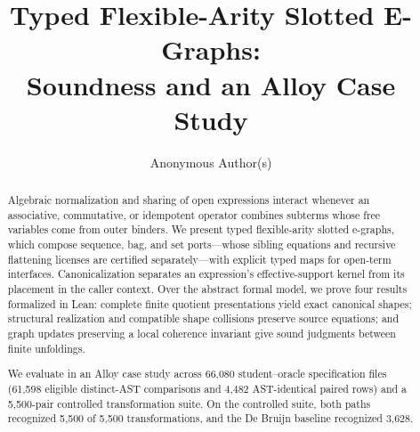\documentclass[runningheads]{llncs}
\title{Typed Flexible-Arity Slotted E-Graphs:\\
Soundness and an Alloy Case Study}
\author{Anonymous Author(s)}
\institute{}
\begin{document}
\maketitle
\begin{abstract}
Algebraic normalization and sharing of open expressions interact whenever an
associative, commutative, or idempotent operator combines subterms whose free
variables come from outer binders. We present typed flexible-arity slotted
e-graphs, which compose sequence, bag, and set ports—whose sibling equations
and recursive flattening licenses are certified separately—with explicit typed
maps for open-term interfaces. Canonicalization separates an expression's
effective-support kernel from its placement in the caller context. Over the
abstract formal model, we prove four results formalized in Lean: complete
finite quotient presentations yield exact canonical shapes; structural
realization and compatible shape collisions preserve source equations; and
graph updates preserving a local coherence invariant give sound judgments
between finite unfoldings.

We evaluate \CanDis{} in an Alloy case study across 66,080 student--oracle
specification files (61,598 eligible distinct-AST comparisons and 4,482
AST-identical paired rows) and a 5,500-pair controlled transformation suite.
 On the controlled suite, both paths recognized 5,500 of 5,500 transformations, and the De Bruijn baseline recognized 3,628.
\end{abstract}





\clearpage
\label{start:references}


\ifdefined\FullDraft
\appendix
\raggedbottom
\clearpage

\clearpage

\clearpage

\fi
\end{document}
